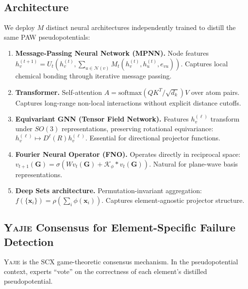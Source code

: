 \documentclass[11pt,a4paper]{article}
\theoremstyle{definition}
\newcommand{\Yajie}{\textsc{Yajie}}
\newcommand{\SCX}{\textsc{SCX}}
\begin{document}
\subsection{Architecture}

We deploy $M$ distinct neural architectures independently trained to distill the same PAW pseudopotentials:

\begin{enumerate}[label=\textbf{E\arabic*:},leftmargin=*]
    \item \textbf{Message-Passing Neural Network (MPNN).} Node features $h_v^{(t+1)} = U_t(h_v^{(t)}, \sum_{u \in \mathcal{N}(v)} M_t(h_v^{(t)}, h_u^{(t)}, e_{vu}))$. Captures local chemical bonding through iterative message passing.
    \item \textbf{Transformer.} Self-attention $A = \mathrm{softmax}(QK^T/\sqrt{d_k})V$ over atom pairs. Captures long-range non-local interactions without explicit distance cutoffs.
    \item \textbf{Equivariant GNN (Tensor Field Network).} Features $h_v^{(\ell)}$ transform under $SO(3)$ representations, preserving rotational equivariance: $h_v^{(\ell)} \mapsto D^\ell(R) h_v^{(\ell)}$. Essential for directional projector functions.
    \item \textbf{Fourier Neural Operator (FNO).} Operates directly in reciprocal space: $v_{t+1}(\mathbf{G}) = \sigma(W v_t(\mathbf{G}) + \mathcal{K}_\phi * v_t(\mathbf{G}))$. Natural for plane-wave basis representations.
    \item \textbf{Deep Sets architecture.} Permutation-invariant aggregation: $f(\{\mathbf{x}_i\}) = \rho(\sum_i \phi(\mathbf{x}_i))$. Captures element-agnostic projector structure.
\end{enumerate}

\subsection{\Yajie{} Consensus for Element-Specific Failure Detection}

\Yajie{} is the \SCX{} game-theoretic consensus mechanism. In the pseudopotential context, experts ``vote'' on the correctness of each element's distilled pseudopotential.
\end{document}
